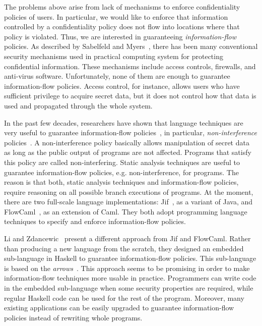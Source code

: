 \documentclass{report}
\begin{document}
The problems above arise from lack of mechanisms to enforce
confidentiality policies of users. In particular, we would like to
enforce that information controlled by a confidentiality policy does 
not flow into locations where that policy is violated. Thus, we are 
interested in guaranteeing \emph{information-flow}
policies. As described by Sabelfeld and Myers~\cite{Sabelfeld:Myers:JSAC},
there has been many conventional security mechanisms used in practical 
computing system for protecting confidential information. These
mechanisms include access controls, 
firewalls, and anti-virus software. Unfortunately, none of them  
are enough to guarantee information-flow policies. 
Access control, for instance, allows users who have sufficient 
privilege to acquire secret data, but it does not control how that data is 
used and propagated through the whole system. 

In the past few decades, researchers have shown that language
techniques are 
very useful to guarantee information-flow policies~\cite{Sabelfeld:Myers:JSAC}, in
particular, \emph{non-interference} policies~\cite{Goguen:Meseguer:Noninterference}. 
A non-interference policy basically allows manipulation of secret data 
as long as the public output of programs are not affected. 
Programs that satisfy this policy are called non-interfering. 
Static analysis techniques are useful to guarantee information-flow
policies, e.g. non-interference, for programs. The reason
is that both, static analysis techniques and information-flow 
policies, require reasoning on all possible branch executions of
programs.  At the moment, there are two full-scale language
implementations: Jif~\cite{jif}, as a variant of Java, and
FlowCaml~\cite{FlowCaml}, as an extension of Caml. They both adopt
programming language techniques to specify and enforce 
information-flow policies.

Li and Zdancewic~\cite{Li:Zdancewic:CSFW} present a different
approach from Jif and FlowCaml. 
Rather than producing a new language from the scratch, 
they designed an embedded sub-language in Haskell to 
guarantee information-flow policies. This sub-language is based on the
{\em arrows}~\cite{Hughes:SCP00}. This approach seems to be promising 
in order to make information-flow techniques more usable in practice.
Programmers can write code in the 
embedded sub-language when some security properties are required,  
while regular Haskell code can be used for the rest of the program.
Moreover, many existing applications can be easily upgraded
to guarantee information-flow policies instead of 
rewriting whole programs.
\end{document}
